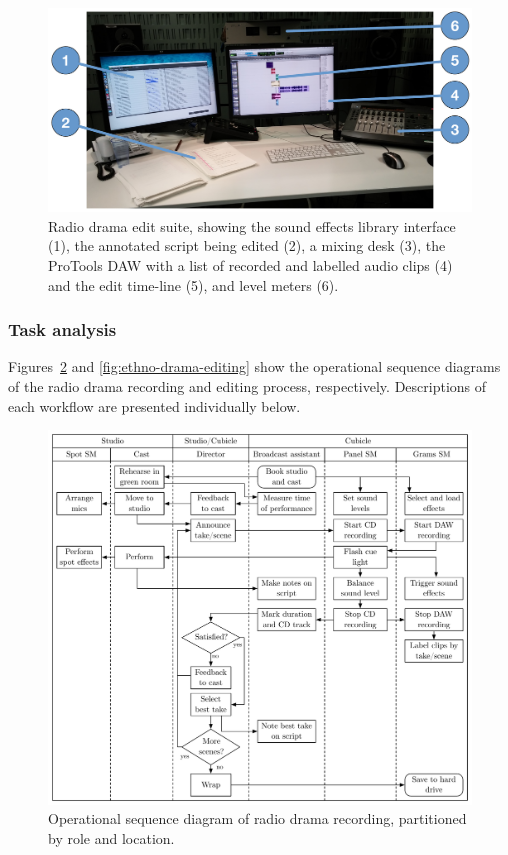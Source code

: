 \begin{figure}[p]
  \centering
  \includegraphics[width=\columnwidth]{figs/drama-edit-labelled.pdf}
  \caption{Radio drama edit suite, showing the sound effects library interface (1), the annotated script being edited
  (2), a mixing desk (3), the ProTools DAW with a list of recorded and labelled audio clips (4) and the edit time-line
  (5), and level meters (6).}
  \label{fig:drama-edit}
\end{figure}

\subsubsection{Task analysis}
Figures~\ref{fig:ethno-drama-recording} and \ref{fig:ethno-drama-editing} show the operational sequence diagrams of the
radio drama recording and editing process, respectively. Descriptions of each workflow are presented individually
below.

\begin{figure}[p]
  \centering
  \includegraphics[width=5in]{figs/drama-recording-workflow.pdf}
  \caption{Operational sequence diagram of radio drama recording, partitioned by role and location.}
  \label{fig:ethno-drama-recording}
\end{figure}

